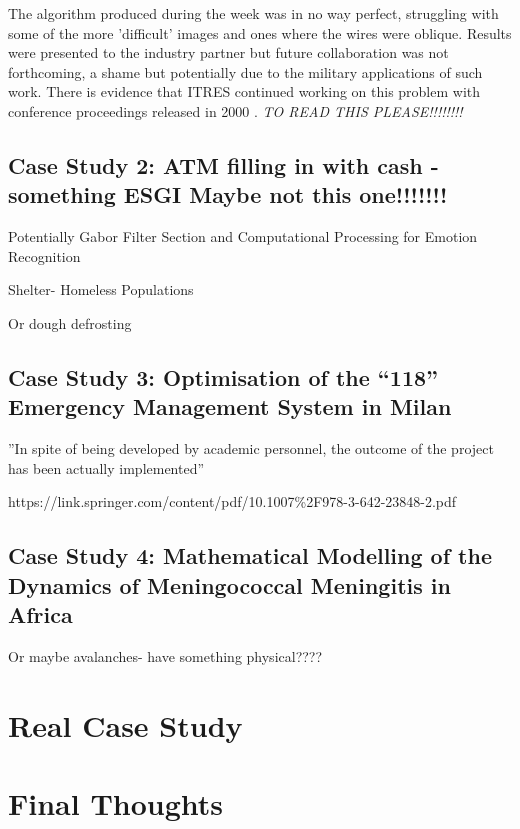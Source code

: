 \documentclass[11pt]{article} %
\begin{document}
	The algorithm produced during the week was in no way perfect, struggling with some of the more 'difficult' images and ones where the wires were oblique. Results were presented to the industry partner but future collaboration was not forthcoming, a shame but potentially due to the military applications of such work. There is evidence that ITRES continued working on this problem with conference proceedings released in 2000 \cite{Babey}. \emph{TO READ THIS PLEASE!!!!!!!!}
	

	
	
	\subsection{Case Study 2: ATM filling in with cash -something ESGI Maybe not this one!!!!!!!}
	
	Potentially Gabor Filter Section and Computational Processing for Emotion Recognition 
	
	Shelter- Homeless Populations 
	
	
	 Or dough defrosting 
	
	
	\subsection{Case Study 3: Optimisation of the “118” Emergency Management System in Milan  }
	
	''In spite of being developed by academic personnel, the outcome of the project has been actually implemented''
	
	https://link.springer.com/content/pdf/10.1007\%2F978-3-642-23848-2.pdf
	
	
	\subsection{Case Study 4: Mathematical Modelling of the Dynamics of Meningococcal Meningitis in Africa  }
	Or maybe avalanches- have something physical????
	
	\section{Real Case Study}
	
	\section{Final Thoughts} 

	
	
	
\end{document}
